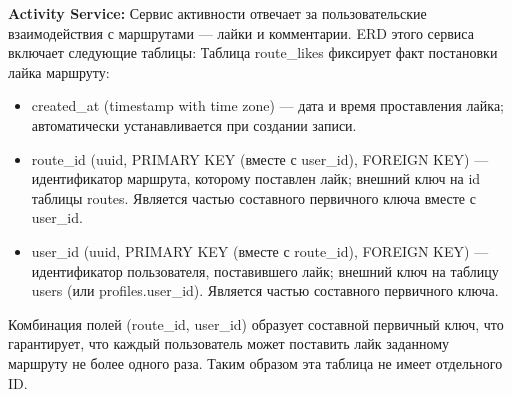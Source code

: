 \textbf{Activity Service:} Сервис активности отвечает за пользовательские взаимодействия с маршрутами — лайки и комментарии. ERD этого сервиса включает следующие таблицы:
Таблица route\_likes фиксирует факт постановки лайка маршруту:
\begin{itemize}
    \item created\_at (timestamp with time zone) — дата и время проставления лайка; автоматически устанавливается при создании записи.
    \item route\_id (uuid, PRIMARY KEY (вместе с user\_id), FOREIGN KEY) — идентификатор маршрута, которому поставлен лайк; внешний ключ на id таблицы routes. Является частью составного первичного ключа вместе с user\_id.
    \item user\_id (uuid, PRIMARY KEY (вместе с route\_id), FOREIGN KEY) — идентификатор пользователя, поставившего лайк; внешний ключ на таблицу users (или profiles.user\_id). Является частью составного первичного ключа.
\end{itemize}
Комбинация полей (route\_id, user\_id) образует составной первичный ключ, что гарантирует, что каждый пользователь может поставить лайк заданному маршруту не более одного раза. Таким образом эта таблица не имеет отдельного ID.

